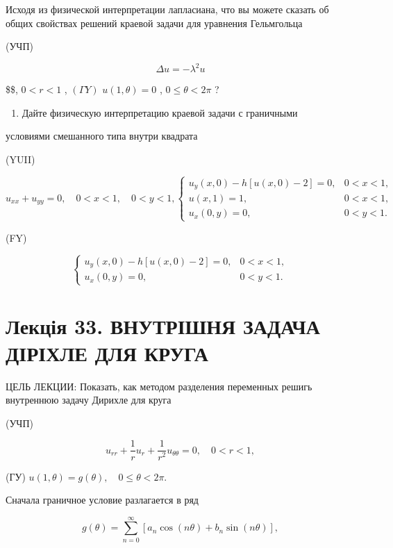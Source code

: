 \documentclass[
  ukrainian,
]{article}
\providecommand{\tightlist}{%
  \setlength{\itemsep}{0pt}\setlength{\parskip}{0pt}}
\begin{document}
Исходя из физической интерпретации лапласиана, что вы можете сказать об
общих свойствах решений краевой задачи для уравнения Гельмгольца

(УЧП)

\[
\Delta u = -\lambda^2 u
\]

\$\$, \(0 < r < 1\) , \((\Gamma Y)\) \(u(1, \theta) = 0\) ,
\(0 \le \theta < 2\pi\) ?

\begin{enumerate}
\def\labelenumi{\arabic{enumi}.}
\setcounter{enumi}{5}
\tightlist
\item
  Дайте физическую интерпретацию краевой задачи с граничными
\end{enumerate}

условиями смешанного типа внутри квадрата

(YUII)

\[
u_{xx} + u_{yy} = 0, \quad 0 < x < 1, \quad 0 < y < 1,
\begin{cases} u_y(x, 0) - h[u(x, 0) - 2] = 0, & 0 < x < 1, \\ u(x, 1) = 1, & 0 < x < 1, \\ u_x(0, y) = 0, & 0 < y < 1. \end{cases}
\]

(FY)

\[
\begin{cases} u_y(x, 0) - h[u(x, 0) - 2] = 0, & 0 < x < 1, \\ u_x(0, y) = 0, & 0 < y < 1. \end{cases}
\]

\section{Лекція 33. ВНУТРІШНЯ ЗАДАЧА ДІРІХЛЕ ДЛЯ
КРУГА}\label{ux43bux435ux43aux446ux456ux44f-33.-ux432ux43dux443ux442ux440ux456ux448ux43dux44f-ux437ux430ux434ux430ux447ux430-ux434ux456ux440ux456ux445ux43bux435-ux434ux43bux44f-ux43aux440ux443ux433ux430}

ЦЕЛЬ ЛЕКЦИИ: Показать, как методом разделения переменных решигь
внутреннюю задачу Дирихле для круга

(УЧП)

\[
u_{rr} + \frac{1}{r} u_r + \frac{1}{r^2} u_{\theta\theta} = 0, \quad 0 < r < 1,
\]

(ГУ) \(u(1, \theta) = g(\theta), \quad 0 \le \theta < 2\pi.\)

Сначала граничное условие разлагается в ряд

\[
g(\theta) = \sum_{n=0}^{\infty} [a_n \cos(n\theta) + b_n \sin(n\theta)],
\]
\end{document}
